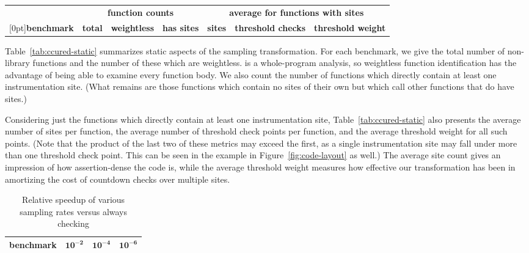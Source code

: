 \begin{table*}[tb]
  \centering
  \begin{tabular}{|l|rrr|rrr|}
    \hline
    & \multicolumn{3}{c|}{\textbf{function counts}} & \multicolumn{3}{c|}{\textbf{average for functions with sites}} \\
    \raisebox{1.5ex}[0pt]{\textbf{benchmark}} & \textbf{total} & \textbf{weightless} & \textbf{has sites} & \textbf{sites} & \textbf{threshold checks} & \textbf{threshold weight} \\
    \hline\hline
    
    \hline
    
    \hline
  \end{tabular}
  \caption{Static metrics for \ccured benchmarks.  Olden benchmarks
    are listed first, followed by SPECINT95.}
  \label{tab:ccured-static}
\end{table*}

Table~\ref{tab:ccured-static} summarizes static aspects of the
sampling transformation.  For each benchmark, we give the total number
of non-library functions and the number of these which are weightless.
\ccured is a whole-program analysis, so weightless function
identification has the advantage of being able to examine every
function body.  We also count the number of functions which directly
contain at least one instrumentation site.  (What remains are those
functions which contain no sites of their own but which call other
functions that do have sites.)

Considering just the functions which directly contain at least one
instrumentation site, Table~\ref{tab:ccured-static} also presents the
average number of sites per function, the average number of threshold
check points per function, and the average threshold weight for all
such points.  (Note that the product of the last two of these metrics
may exceed the first, as a single instrumentation site may fall under
more than one threshold check point.  This can be seen in the example
in Figure~\ref{fig:code-layout} as well.)  The average site count
gives an impression of how assertion-dense the code is, while the
average threshold weight measures how effective our transformation has
been in amortizing the cost of countdown checks over multiple sites.

\begin{table}
  \centering
  \begin{tabular}{|l|rrr|}
    \hline
    \rule{0pt}{2.5ex}
    \textbf{benchmark} & $\mathbf{10^{-2}}$ & $\mathbf{10^{-4}}$ & $\mathbf{10^{-6}}$ \\
    \hline\hline
    
    \hline
    
    \hline
  \end{tabular}
  \caption{Relative speedup of various sampling rates versus always checking}
  \label{tab:ccured-density}
\end{table}

